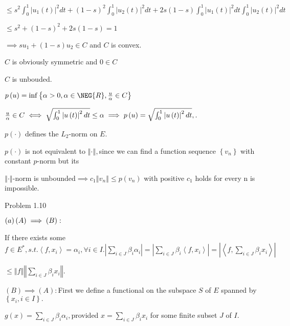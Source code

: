 \documentclass{article}
\begin{document}
$\leq s^{2}\int_{0}^{1}\left\vert u_{1}\left( t\right) \right\vert
^{2}dt+\left( 1-s\right) ^{2}\int_{0}^{1}\left\vert u_{2}\left( t\right)
\right\vert ^{2}dt+2s\left( 1-s\right) \int_{0}^{1}\left\vert u_{1}\left(
t\right) \right\vert ^{2}dt\int_{0}^{1}\left\vert u_{2}\left( t\right)
\right\vert ^{2}dt$

$\leq s^{2}+\left( 1-s\right) ^{2}+2s\left( 1-s\allowbreak \right)
=\allowbreak 1$

$\implies su_{1}+\left( 1-s\right) u_{2}\in C$ and $C$ is convex.

$C$ is obviously symmetric and $0\in C$

$C$ is unbouded.

$p\left( u\right) =\inf \left\{ \alpha >0,\alpha \in \NEG{R},\frac{u}{\alpha 
}\in C\right\} $

$\frac{u}{\alpha }\in C\iff \sqrt{\int_{0}^{1}\left\vert u\left( t\right)
\right\vert ^{2}dt}\leq \alpha \implies p\left( u\right) =\sqrt{%
\int_{0}^{1}\left\vert u\left( t\right) \right\vert ^{2}dt},.$

$p\left( \cdot \right) $ defines the $L_{2}$-norm on $E$.

$p\left( \cdot \right) $ is not equivalent to $\left\Vert \cdot \right\Vert
, $since we can find a function sequence $\left\{ v_{n}\right\} $ with
constant $p$-norm but its

$\left\Vert \cdot \right\Vert $-norm is unbounded$\implies c_{1}\left\Vert
v_{n}\right\Vert \leq p\left( v_{n}\right) $ with positive $c_{1}$ holds for
every n is impossible.

Problem 1.10

$\bigskip \left( a\right) \left( A\right) \implies \left( B\right) :$

If there exists some $f\in E^{\ast },s.t.\left\langle f,x_{i}\right\rangle
=\alpha _{i},\forall i\in I.\left\vert \underset{i\in J}{\sum }\beta
_{i}\alpha _{i}\right\vert =\left\vert \underset{i\in J}{\sum }\beta
_{i}\left\langle f,x_{i}\right\rangle \right\vert =\left\vert \left\langle f,%
\underset{i\in J}{\sum }\beta _{i}x_{i}\right\rangle \right\vert $

$\leq \left\Vert f\right\Vert \left\Vert \underset{i\in J}{\sum }\beta
_{i}x_{i}\right\Vert .$

$\left( B\right) \implies \left( A\right) :$First we define a functional on
the subspace $S$ of $E$ spanned by $\left\{ x_{i},i\in I\right\} .$

$g\left( x\right) =\underset{i\in J}{\sum }\beta _{i}\alpha _{i},$provided $%
x=\underset{i\in J}{\sum }\beta _{i}x_{i}$ for some finite subset $J$ of $I.$
\end{document}
